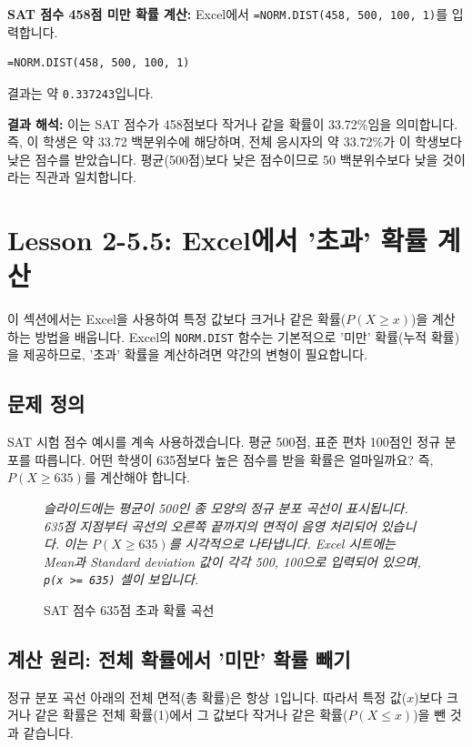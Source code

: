 \documentclass[11pt,a4paper]{article}
\theoremstyle{definition}
\newcommand{\newsection}[1]{\newpage\section{#1}}
\begin{document}
\begin{examplebox}
    \textbf{SAT 점수 458점 미만 확률 계산:}
    Excel에서 \texttt{=NORM.DIST(458, 500, 100, 1)}를 입력합니다.
    \begin{lstlisting}[caption={Excel에서 '미만' 확률 계산 예시}, label={lst:norm_dist_less_than}]
=NORM.DIST(458, 500, 100, 1)
    \end{lstlisting}
    결과는 약 \texttt{0.337243}입니다.

    \textbf{결과 해석:}
    이는 SAT 점수가 458점보다 작거나 같을 확률이 33.72\%임을 의미합니다.
    즉, 이 학생은 약 33.72 백분위수에 해당하며, 전체 응시자의 약 33.72\%가 이 학생보다 낮은 점수를 받았습니다.
    평균(500점)보다 낮은 점수이므로 50 백분위수보다 낮을 것이라는 직관과 일치합니다.
\end{examplebox}

\newsection{Lesson 2-5.5: Excel에서 '초과' 확률 계산}

이 섹션에서는 Excel을 사용하여 특정 값보다 크거나 같은 확률($P(X \ge x)$)을 계산하는 방법을 배웁니다.
Excel의 \texttt{NORM.DIST} 함수는 기본적으로 '미만' 확률(누적 확률)을 제공하므로, '초과' 확률을 계산하려면 약간의 변형이 필요합니다.

\subsection{문제 정의}
SAT 시험 점수 예시를 계속 사용하겠습니다. 평균 500점, 표준 편차 100점인 정규 분포를 따릅니다.
어떤 학생이 635점보다 높은 점수를 받을 확률은 얼마일까요?
즉, $P(X \ge 635)$를 계산해야 합니다.

\begin{figure}[h!]
    \centering
    \caption{SAT 점수 635점 초과 확률 곡선}
    \label{fig:sat_greater_than}
    \vspace{0.5em}
    \textit{슬라이드에는 평균이 500인 종 모양의 정규 분포 곡선이 표시됩니다. 635점 지점부터 곡선의 오른쪽 끝까지의 면적이 음영 처리되어 있습니다. 이는 $P(X \ge 635)$를 시각적으로 나타냅니다. Excel 시트에는 Mean과 Standard deviation 값이 각각 500, 100으로 입력되어 있으며, \texttt{p(x >= 635)} 셀이 보입니다.}
\end{figure}

\subsection{계산 원리: 전체 확률에서 '미만' 확률 빼기}
정규 분포 곡선 아래의 전체 면적(총 확률)은 항상 1입니다.
따라서 특정 값($x$)보다 크거나 같은 확률은 전체 확률(1)에서 그 값보다 작거나 같은 확률($P(X \le x)$)을 뺀 것과 같습니다.
\end{document}
